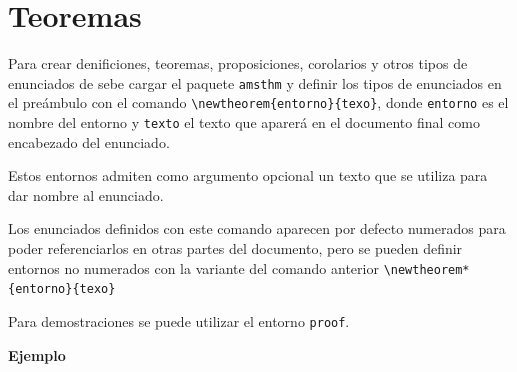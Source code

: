 \documentclass[
  a4paper,
]{scrreport}
\begin{document}
\hypertarget{teoremas}{%
\section{Teoremas}\label{teoremas}}

Para crear denificiones, teoremas, proposiciones, corolarios y otros
tipos de enunciados de sebe cargar el paquete \texttt{amsthm} y definir
los tipos de enunciados en el preámbulo con el comando
\texttt{\textbackslash{}newtheorem\{entorno\}\{texo\}}, donde
\texttt{entorno} es el nombre del entorno y \texttt{texto} el texto que
aparerá en el documento final como encabezado del enunciado.

Estos entornos admiten como argumento opcional un texto que se utiliza
para dar nombre al enunciado.

Los enunciados definidos con este comando aparecen por defecto numerados
para poder referenciarlos en otras partes del documento, pero se pueden
definir entornos no numerados con la variante del comando anterior
\texttt{\textbackslash{}newtheorem*\{entorno\}\{texo\}}

Para demostraciones se puede utilizar el entorno \texttt{proof}.

\textbf{Ejemplo}
\end{document}
